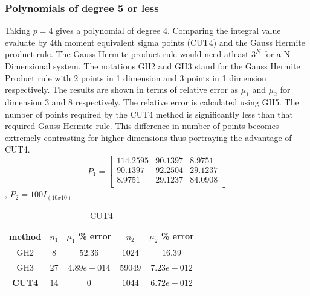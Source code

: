 \documentclass[letterpaper, 10 pt, conference]{ieeeconf}  %
\begin{document}
\subsubsection{Polynomials of degree 5 or less}
Taking $p=4$ gives a polynomial of degree 4. Comparing the integral value evaluate by 4th moment equivalent sigma points (CUT4) and the Gauss Hermite product rule. The Gauss Hermite product rule would need atleast $3^N$ for a N-Dimensional system. The notations GH2 and GH3 stand for the Gauss Hermite Product rule with 2 points in 1 dimension and 3 points in 1 dimension respectively. The results are shown in terms of relative error as $\mu_1$ and $\mu_2$ for dimension 3 and 8 respectively. The relative error is calculated using GH5. The number of points required by the CUT4 method is significantly less than that required Gauss Hermite rule. This difference in number of points becomes extremely contrasting for higher dimensions thus portraying the advantage of CUT4.
\[
 P_1 = \begin{bmatrix}
       114.2595 & 90.1397 & 8.9751    \\
       90.1397 & 92.2504 & 29.1237    \\
       8.9751 & 29.1237 & 84.0908  \\

     \end{bmatrix}
\], $P_2=100I_{(10x10)}$  
\begin{table}
\normalsize
\caption{CUT4}
\begin{center}
\begin{tabular}{|c||c|c||c|c|}
\hline
method     & 		$n_1$ 	 	 	&				$\mu_1$ \% error 		& 		$n_2$     & 	$\mu_2$ \% error						\\
\hline
GH2  	 &  	 	$8$ 			 	&	  		$	52.36$ 				 	      &   $1024$          &     $16.39$									 \\
\hline 
GH3   	 &  	 	$27$ 			 	&	  		$4.89e-014$ 				 	  &     $59049$        &     $7.23e-012$									 \\
\hline
{\bf CUT4 	}			 &	  	$14$  				&  		$0$ 				              &       $1044$      & 		$6.72e-012$								\\
\hline
\end{tabular}
\end{center}
\end{table}
\end{document}
